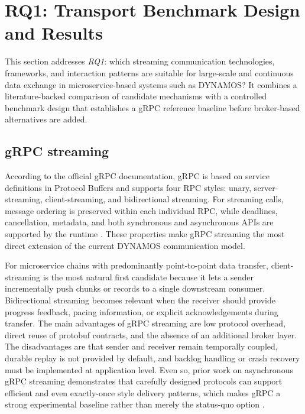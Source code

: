 \section{RQ1: Transport Benchmark Design and Results}
\label{sec:rq1}

This section addresses \emph{RQ1}: which streaming communication technologies, frameworks, and interaction patterns are suitable for large-scale and continuous data exchange in microservice-based systems such as DYNAMOS? It combines a literature-backed comparison of candidate mechanisms with a controlled benchmark design that establishes a gRPC reference baseline before broker-based alternatives are added.

\subsection{gRPC streaming}

According to the official gRPC documentation, gRPC is based on service definitions in Protocol Buffers and supports four RPC styles: unary, server-streaming, client-streaming, and bidirectional streaming. For streaming calls, message ordering is preserved within each individual RPC, while deadlines, cancellation, metadata, and both synchronous and asynchronous APIs are supported by the runtime \cite{grpc2024coreconcepts}. These properties make gRPC streaming the most direct extension of the current DYNAMOS communication model.

For microservice chains with predominantly point-to-point data transfer, client-streaming is the most natural first candidate because it lets a sender incrementally push chunks or records to a single downstream consumer. Bidirectional streaming becomes relevant when the receiver should provide progress feedback, pacing information, or explicit acknowledgements during transfer. The main advantages of gRPC streaming are low protocol overhead, direct reuse of protobuf contracts, and the absence of an additional broker layer. The disadvantages are that sender and receiver remain temporally coupled, durable replay is not provided by default, and backlog handling or crash recovery must be implemented at application level. Even so, prior work on asynchronous gRPC streaming demonstrates that carefully designed protocols can support efficient and even exactly-once style delivery patterns, which makes gRPC a strong experimental baseline rather than merely the status-quo option \cite{roohitavaf2019logplayer,restgrpccomparison,sodankoor2026grpcbench}.

